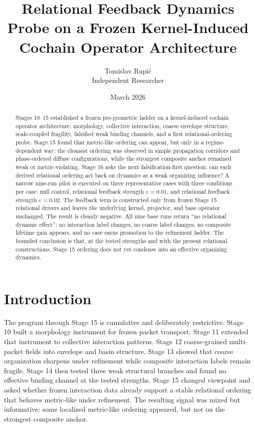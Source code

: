 \documentclass[11pt]{article}
\title{Relational Feedback Dynamics Probe on a Frozen Kernel-Induced Cochain Operator Architecture}
\author{Tomislav Rupi\'c \\ Independent Researcher}
\date{March 2026}
\begin{document}
\maketitle

\begin{abstract}
Stages 10--15 established a frozen pre-geometric ladder on a kernel-induced cochain operator architecture: morphology, collective interaction, coarse envelope structure, scale-coupled fragility, falsified weak binding channels, and a first relational-ordering probe. Stage 15 found that metric-like ordering can appear, but only in a regime-dependent way: the cleanest ordering was observed in simple propagation corridors and phase-ordered diffuse configurations, while the strongest composite anchor remained weak or metric-violating. Stage 16 asks the next falsification-first question: can such derived relational ordering act back on dynamics as a weak organizing influence? A narrow nine-run pilot is executed on three representative cases with three conditions per case: null control, relational feedback strength $\varepsilon=0.01$, and relational feedback strength $\varepsilon=0.02$. The feedback term is constructed only from frozen Stage 15 relational drivers and leaves the underlying kernel, projector, and base operator unchanged. The result is cleanly negative. All nine base runs return ``no relational dynamic effect''; no interaction label changes, no coarse label changes, no composite lifetime gain appears, and no case earns promotion to the refinement ladder. The bounded conclusion is that, at the tested strengths and with the present relational constructions, Stage 15 ordering does not yet condense into an effective organizing dynamics.
\end{abstract}

\section{Introduction}

The program through Stage 15 is cumulative and deliberately restrictive. Stage 10 built a morphology instrument for frozen packet transport. Stage 11 extended that instrument to collective interaction patterns. Stage 12 coarse-grained multi-packet fields into envelope and basin structure. Stage 13 showed that coarse organization sharpens under refinement while composite interaction labels remain fragile. Stage 14 then tested three weak structural branches and found no effective binding channel at the tested strengths. Stage 15 changed viewpoint and asked whether frozen interaction data already support a stable relational ordering that behaves metric-like under refinement. The resulting signal was mixed but informative: some localized metric-like ordering appeared, but not on the strongest composite anchor.
\end{document}
